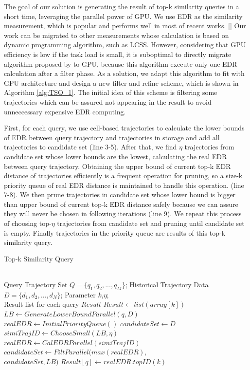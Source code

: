 \documentclass[conference]{IEEEtran}
\begin{document}
The goal of our solution is generating the result of top-k similarity queries in a short time, leveraging the parallel power of GPU. We use EDR as the similarity measurement, which is popular and performs well in most of recent works. \cite{EDWP15}[] Our work can be migrated to other measurements whose calculation is based on dynamic programming algorithm, such as LCSS\cite{DBLP:conf/icde/VlachosGK02}. However, considering that GPU efficiency is low if the task load is small, it is suboptimal to directly migrate algorithm proposed by \cite{DBLP:conf/sigmod/ChenOO05} to GPU, because this algorithm execute only one EDR calculation after a filter phase. As a solution, we adapt this algorithm to fit with GPU architecture and design a new filter and refine scheme, which is shown in Algorithm \ref{alg:TSQ_1}. The initial idea of this scheme is filtering some trajectories which can be assured not appearing in the result to avoid unneccessary expensive EDR computing. 

First, for each query, we use cell-based trajectories to calculate the lower bounds of EDR between query trajectory and trajectories in storage and add all trajectories to candidate set (line 3-5). After that, we find $\eta$ trajectories from candidate set whose lower bounds are the lowest, calculating the real EDR between query trajectory. Obtaining the upper bound of current top-k EDR distance of trajectories efficiently is a frequent operation for pruning, so a size-k priority queue of real EDR distance is maintained to handle this operation. (line 7-8). We then prune trajectories in candidate set whose lower bound is bigger than upper bound of current top-k EDR distance safely because we can assure they will never be chosen in following iterations (line 9). We repeat this process of choosing top-$\eta$ trajectories from candidate set and pruning until candidate set is empty. Finally trajectories in the priority queue are results of this top-k similarity query.

\begin{algorithm}[htb]
	\caption{Top-k Similarity Query}
	\label{alg:TSQ_1}
	\begin{algorithmic}[1]
		\REQUIRE ~~\\
		Query Trajectory Set $Q=\{ q_{1},q_{2},...,q_{M}\}$; Historical Trajectory Data $D=\{ d_{1},d_{2},...,d_{N}\}$; Parameter $k$,$\eta$;
		\ENSURE ~~\\
		Result list for each query $Result$
		\STATE $Result \leftarrow list(array[k])$
		\STATE $LB \leftarrow GenerateLowerBoundParallel(q,D)$
		\STATE $realEDR \leftarrow InitialPriorityQueue()$
		\STATE $candidateSet \leftarrow D$
		\STATE $simiTrajID \leftarrow ChooseSmall(LB,\eta)$
		\STATE $realEDR \leftarrow CalEDRParallel(simiTrajID)$
		\STATE $candidateSet \leftarrow FiltParallel(max(realEDR),$\\$candidateSet,LB)$
		\ENDWHILE
		\STATE $Result[q] \leftarrow realEDR.topID(k)$
		\ENDFOR
	\end{algorithmic}
\end{algorithm}
\end{document}
